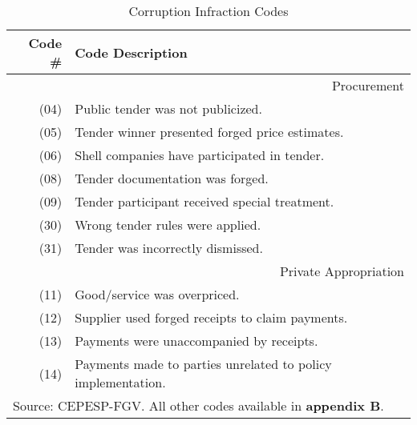 \documentclass[11pt]{article}
\author{Andre Assumpcao}
\newcommand\T{\rule{0pt}{2.6ex}}       %
\newcommand\B{\rule[-1.2ex]{0pt}{0pt}} %
\begin{document}
\begin{table}[!htbp]
  \caption{\label{tab:corruptioncodes} Corruption Infraction Codes}
  \centering
  \small
  \begin{tabular}{r|l}
  \hline

  \hline
  Code \# & Code Description                                          \T \B \\
  \hline
  \multicolumn{2}{r}{Procurement}                                     \T \B \\
  \hline
  (04) & Public tender was not publicized.                            \T \B \\
  (05) & Tender winner presented forged price estimates.              \T \B \\
  (06) & Shell companies have participated in tender.                 \T \B \\
  (08) & Tender documentation was forged.                             \T \B \\
  (09) & Tender participant received special treatment.               \T \B \\
  (30) & Wrong tender rules were applied.                             \T \B \\
  (31) & Tender was incorrectly dismissed.                            \T \B \\
  \hline
  \multicolumn{2}{r}{Private Appropriation}                           \T \B \\
  \hline
  (11) & Good/service was overpriced.                                 \T \B \\
  (12) & Supplier used forged receipts to claim payments.      \T \B \\
  (13) & Payments were unaccompanied by receipts.                     \T \B \\
  (14) & Payments made to parties unrelated to policy implementation. \T \B \\
  \hline

  \hline
  \multicolumn{2}{l}{\footnotesize Source: CEPESP-FGV. All other codes available in {\bf appendix B}.} \T
  \end{tabular}
\end{table}
\end{document}
